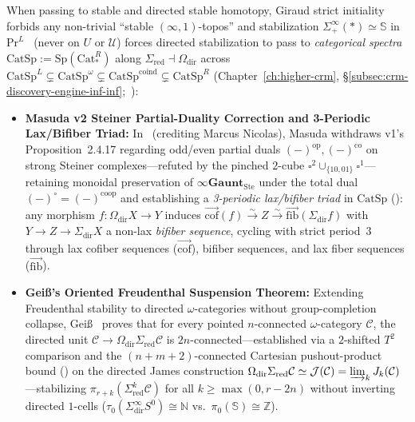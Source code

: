 \documentclass[10pt,twoside,openright]{book}
\theoremstyle{crmplain}
\theoremstyle{crmdef}
\theoremstyle{crmremark}
\begin{document}
When passing to stable and directed stable homotopy, Giraud strict initiality~\cite[Thm.~6.1.0.6, \S 6.1.1]{Lurie09} forbids any non-trivial ``stable $(\infty, 1)$-topos'' and stabilization $\Sigma^\infty_+(*) \simeq \mathbb{S}$ in $\mathrm{Pr}^L$~\cite[\S\S 1.4.4, 4.8.2]{Lurie17} (never on $U$ or $\mathcal{U}$) forces directed stabilization to pass to \emph{categorical spectra} $\mathrm{CatSp} := \mathrm{Sp}(\mathrm{Cat}^R_*)$ along $\Sigma_{\mathrm{red}} \dashv \Omega_{\mathrm{dir}}$ across $\mathrm{CatSp}^L \subsetneq \mathrm{CatSp}^\omega \subsetneq \mathrm{CatSp}^{\mathrm{coind}} \subsetneq \mathrm{CatSp}^R$ (Chapter~\ref{ch:higher-crm}, \S\ref{subsec:crm-discovery-engine-inf-inf};~\cite{Masuda26,Heine26,ORW26}):
\begin{itemize}[leftmargin=1.5em]
  \item \textbf{Masuda v2 Steiner Partial-Duality Correction and 3-Periodic Lax/Bifiber Triad:} In~\cite[Section~2.4, Footnote~5]{Masuda26} (crediting Marcus Nicolas), Masuda withdraws v1's Proposition~2.4.17 regarding odd/even partial duals $(-)^{\mathrm{op}}, (-)^{\mathrm{co}}$ on strong Steiner complexes---refuted by the pinched $2$-cube $\square^2 \cup_{\{10, 01\}} \square^1$---retaining monoidal preservation of $\infty\mathbf{Gaunt}_{\mathrm{Ste}}$ under the total dual $(-)^{\circ} = (-)^{\mathrm{coop}}$ and establishing a \emph{3-periodic lax/bifiber triad} in $\mathrm{CatSp}$ (\cite[Theorem~5.3.1 and Remark~5.3.4]{Masuda26}): any morphism $f : \Omega_{\mathrm{dir}} X \to Y$ induces $\overrightarrow{\mathrm{cof}}(f) \xrightarrow{\sim} Z \xrightarrow{\sim} \overrightarrow{\mathrm{fib}}(\Sigma_{\mathrm{dir}} f)$ with $Y \to Z \to \Sigma_{\mathrm{dir}} X$ a non-lax \emph{bifiber sequence}, cycling with strict period~$3$ through lax cofiber sequences ($\overrightarrow{\mathrm{cof}}$), bifiber sequences, and lax fiber sequences ($\overrightarrow{\mathrm{fib}}$).
  \item \textbf{Gei\ss's Oriented Freudenthal Suspension Theorem:} Extending Freudenthal stability to directed $\omega$-categories without group-completion collapse, Gei\ss~\cite[Theorem~5.1 and Corollary~5.14]{Geiss26} proves that for every pointed $n$-connected $\omega$-category $\mathcal{C}$, the directed unit $\mathcal{C} \to \Omega_{\mathrm{dir}}\Sigma_{\mathrm{red}}\mathcal{C}$ is $2n$-connected---established via a $2$-shifted $T^2$ comparison and the $(n + m + 2)$-connected Cartesian pushout-product bound (\cite[Theorem~4.13]{Geiss26}) on the directed James construction $\Omega_{\mathrm{dir}}\Sigma_{\mathrm{red}}\mathcal{C} \simeq \mathcal{J}(\mathcal{C}) = \varinjlim_k J_k(\mathcal{C})$---stabilizing $\pi_{r+k}(\Sigma_{\mathrm{red}}^k \mathcal{C})$ for all $k \ge \max(0, r - 2n)$ without inverting directed $1$-cells ($\tau_0(\Sigma^\infty_{\mathrm{dir}} S^0) \cong \mathbb{N}$ vs.\ $\pi_0(\mathbb{S}) \cong \mathbb{Z}$).
\end{itemize}
\end{document}
